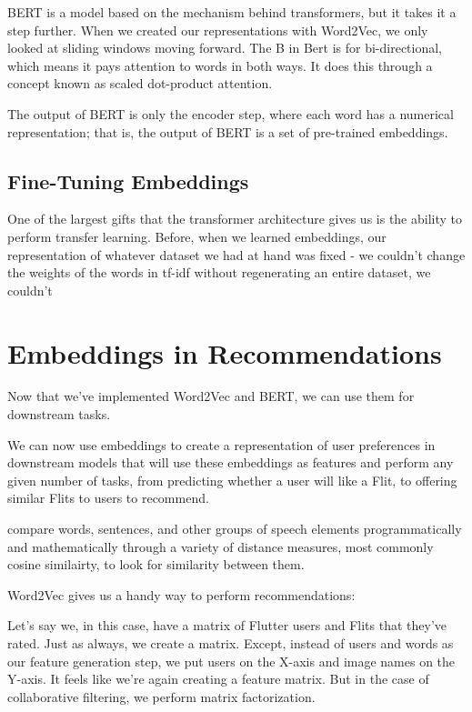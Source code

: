 \documentclass[draft, 11pt]{diazessay} %
\begin{document}
BERT is a model based on the mechanism behind transformers, but it takes it a step further. When we created our representations with Word2Vec, we only looked at sliding windows moving forward. The B in Bert is for bi-directional, which means it pays attention to words in both ways. It does this through a concept known as scaled dot-product attention. 

The output of BERT is only the encoder step, where each word has a numerical representation; that is, the output of BERT is a set of pre-trained embeddings. 

\subsection{Fine-Tuning Embeddings}

One of the largest gifts that the transformer architecture gives us is the ability to perform transfer learning. Before, when we learned embeddings, our representation of whatever dataset we had at hand was fixed - we couldn't change the weights of the words in tf-idf without regenerating an entire dataset, we couldn't 

\section{Embeddings in Recommendations}

Now that we've implemented Word2Vec and BERT, we can use them for downstream tasks. 

We can now use embeddings to create a representation of user preferences in downstream models that will use these embeddings as features and perform any given number of tasks, from predicting whether a user will like a Flit, to offering similar Flits to users to recommend. 

compare words, sentences, and other groups of speech elements programmatically and mathematically through a variety of distance measures, most commonly cosine similairty, to look for similarity between them. 

Word2Vec gives us a handy way to perform recommendations: 

Let’s say we, in this case, have a matrix of Flutter users and Flits that they’ve rated. Just as always, we create a matrix. Except, instead of users and words as our feature generation step, we put users on the X-axis and image names on the Y-axis. It feels like we’re again creating a feature matrix. But in the case of collaborative filtering, we perform matrix factorization. 
\end{document}
